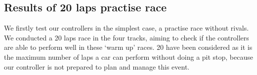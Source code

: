 \documentclass[runningheads,a4paper]{llncs}
\begin{document}
	
	
	\subsection{Results of 20 laps practise race}
	
	We firstly test our controllers in the simplest case, a practise race without rivals. 
	We conducted a 20 laps race in the four tracks, aiming to check if the controllers are able to perform well in these `warm up' races.
	20 have been considered as it is the maximum number of laps a car can perform without doing a pit stop, because our controller is not prepared to plan and manage this event. 
	
\end{document}
